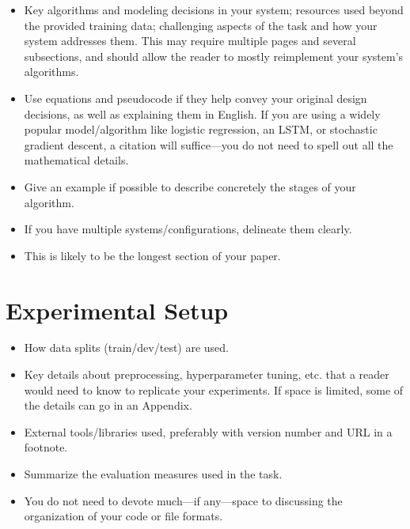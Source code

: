 \documentclass[11pt]{article}
\begin{document}
\begin{itemize}
	\item Key algorithms and modeling decisions in your system; resources used beyond the provided training data; challenging aspects of the task and how your system addresses them. This may require multiple pages and several subsections, and should allow the reader to mostly reimplement your system’s algorithms.
	
	\item Use equations and pseudocode if they help convey your original design decisions, as well as explaining them in English. If you are using a widely popular model/algorithm like logistic regression, an LSTM, or stochastic gradient descent, a citation will suffice—you do not need to spell out all the mathematical details.
	
	\item Give an example if possible to describe concretely the stages of your algorithm.
	
	\item If you have multiple systems/configurations, delineate them clearly.
	
	\item This is likely to be the longest section of your paper.
	
\end{itemize}

\section{Experimental Setup}

\begin{itemize}
	\item How data splits (train/dev/test) are used.
	
	\item Key details about preprocessing, hyperparameter tuning, etc. that a reader would need to know to replicate your experiments. If space is limited, some of the details can go in an Appendix.
	
	\item External tools/libraries used, preferably with version number and URL in a footnote.
	
	\item Summarize the evaluation measures used in the task.
	
	\item You do not need to devote much—if any—space to discussing the organization of your code or file formats.
	
\end{itemize}
\end{document}
